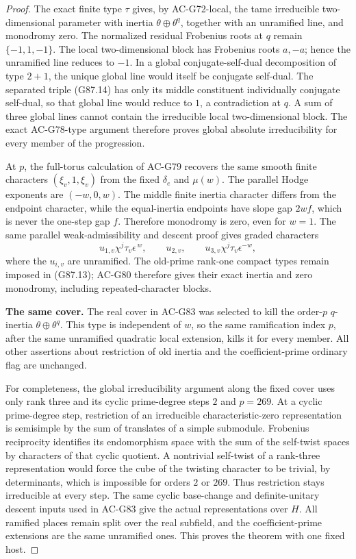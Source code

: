 \begin{proof}
The exact finite type \(\tau\) gives, by AC-G72-local, the tame
irreducible two-dimensional parameter with inertia
\(\theta\oplus\theta^q\), together with an unramified line, and
monodromy zero.
The normalized residual Frobenius roots at \(q\) remain
\(\{-1,1,-1\}\).
The local two-dimensional block has Frobenius roots \(a,-a\);
hence the unramified line reduces to \(-1\).
In a global conjugate-self-dual decomposition of type \(2+1\),
the unique global line would itself be conjugate self-dual.
The separated triple (G87.14) has only its middle constituent
individually conjugate self-dual, so that global line would reduce
to \(1\), a contradiction at \(q\).
A sum of three global lines cannot contain the irreducible local
two-dimensional block.
The exact AC-G78-type argument therefore proves global absolute
irreducibility for every member of the progression.

At \(p\), the full-torus calculation of AC-G79 recovers the same
smooth finite characters \((\xi_v,1,\xi_v)\) from the fixed
\(\delta_e\) and \(\mu(w)\).
The parallel Hodge exponents are \((-w,0,w)\).
The middle finite inertia character differs from the endpoint
character, while the equal-inertia endpoints have slope gap
\(2wf\), which is never the one-step gap \(f\).
Therefore monodromy is zero, even for \(w=1\).
The same parallel weak-admissibility and descent proof gives
graded characters
\[
 u_{1,v}\chi^j\tau_v\epsilon^{\,w},\qquad
 u_{2,v},\qquad
 u_{3,v}\chi^j\tau_v\epsilon^{-w},
 \tag{G87.15}
\]
where the \(u_{i,v}\) are unramified.
The old-prime rank-one compact types remain imposed in (G87.13);
AC-G80 therefore gives their exact inertia and zero monodromy,
including repeated-character blocks.

\noindent\textbf{The same cover.}
The real cover in AC-G83 was selected to kill the order-\(p\)
\(q\)-inertia \(\theta\oplus\theta^q\).
This type is independent of \(w\), so the same ramification index
\(p\), after the same unramified quadratic local extension, kills it
for every member.
All other assertions about restriction of old inertia and the
coefficient-prime ordinary flag are unchanged.

For completeness, the global irreducibility argument along the
fixed cover uses only rank three and its cyclic prime-degree steps
\(2\) and \(p=269\).
At a cyclic prime-degree step, restriction of an irreducible
characteristic-zero representation is semisimple by the sum of
translates of a simple submodule.
Frobenius reciprocity identifies its endomorphism space with the sum
of the self-twist spaces by characters of that cyclic quotient.
A nontrivial self-twist of a rank-three representation would force
the cube of the twisting character to be trivial, by determinants,
which is impossible for orders \(2\) or \(269\).
Thus restriction stays irreducible at every step.
The same cyclic base-change and definite-unitary descent inputs used
in AC-G83 give the actual representations over \(H\).
All ramified places remain split over the real subfield, and the
coefficient-prime extensions are the same unramified ones.
This proves the theorem with one fixed host.
\end{proof}

